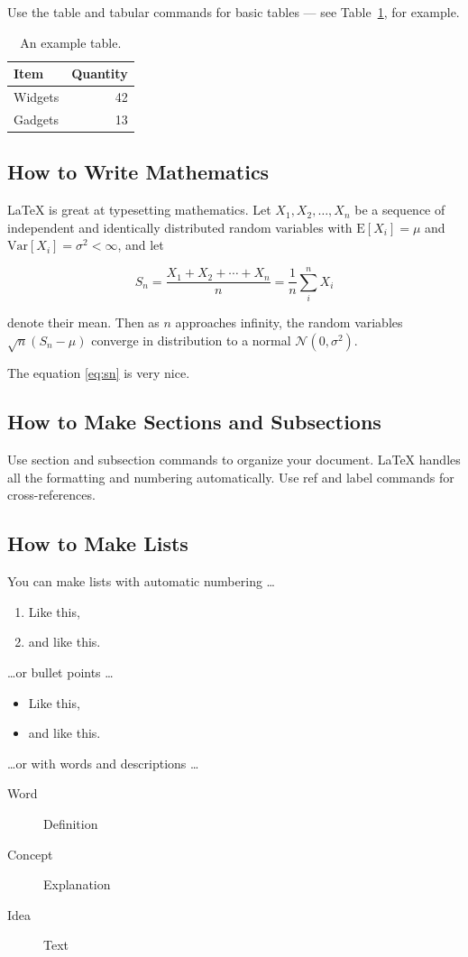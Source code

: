 \documentclass[a4paper]{article}
\begin{document}
Use the table and tabular commands for basic tables --- see Table~\ref{tab:widgets}, for example.

\begin{table}
\centering
\begin{tabular}{l|r}
Item & Quantity \\\hline
Widgets & 42 \\
Gadgets & 13
\end{tabular}
\caption{\label{tab:widgets}An example table.}
\end{table}

\subsection{How to Write Mathematics}

\LaTeX{} is great at typesetting mathematics. Let $X_1, X_2, \ldots, X_n$ be a sequence of independent and identically distributed random variables with $\text{E}[X_i] = \mu$ and $\text{Var}[X_i] = \sigma^2 < \infty$, and let

\begin{equation}
S_n = \frac{X_1 + X_2 + \cdots + X_n}{n}
      = \frac{1}{n}\sum_{i}^{n} X_i
\label{eq:sn}
\end{equation}

denote their mean. Then as $n$ approaches infinity, the random variables $\sqrt{n}(S_n - \mu)$ converge in distribution to a normal $\mathcal{N}(0, \sigma^2)$.

The equation \ref{eq:sn} is very nice.

\subsection{How to Make Sections and Subsections}

Use section and subsection commands to organize your document. \LaTeX{} handles all the formatting and numbering automatically. Use ref and label commands for cross-references.

\subsection{How to Make Lists}

You can make lists with automatic numbering \dots

\begin{enumerate}
\item Like this,
\item and like this.
\end{enumerate}
\dots or bullet points \dots
\begin{itemize}
\item Like this,
\item and like this.
\end{itemize}
\dots or with words and descriptions \dots
\begin{description}
\item[Word] Definition
\item[Concept] Explanation
\item[Idea] Text
\end{description}
\end{document}
